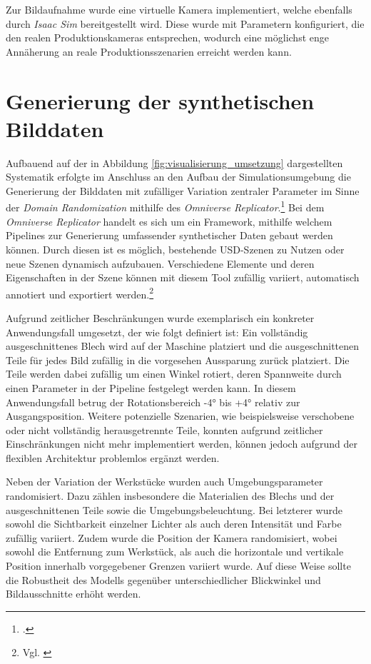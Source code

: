 Zur Bildaufnahme wurde eine virtuelle Kamera implementiert, welche ebenfalls durch \textit{Isaac Sim} bereitgestellt wird. Diese wurde mit Parametern konfiguriert, die den realen Produktionskameras entsprechen, wodurch eine möglichst enge Annäherung an reale Produktionsszenarien erreicht werden kann.


\section{Generierung der synthetischen Bilddaten}

Aufbauend auf der in Abbildung \ref{fig:visualisierung_umsetzung} dargestellten Systematik erfolgte im Anschluss an den Aufbau der Simulationsumgebung die Generierung der Bilddaten mit zufälliger Variation zentraler Parameter im Sinne der \textit{Domain Randomization} mithilfe des \textit{Omniverse Replicator}.\footcite{nvidia_replicator_2025}
Bei dem \textit{Omniverse Replicator} handelt es sich um ein Framework, mithilfe welchem Pipelines zur Generierung umfassender synthetischer Daten gebaut werden können. Durch diesen ist es möglich, bestehende USD-Szenen zu Nutzen oder neue Szenen dynamisch aufzubauen. Verschiedene Elemente und deren Eigenschaften in der Szene können mit diesem Tool zufällig variiert, automatisch annotiert und exportiert werden.\footnote{Vgl. \cite{nvidia_replicator_2025}}

Aufgrund zeitlicher Beschränkungen wurde exemplarisch ein konkreter Anwendungsfall umgesetzt, der wie folgt definiert ist:
Ein vollständig ausgeschnittenes Blech wird auf der Maschine platziert und die ausgeschnittenen Teile für jedes Bild zufällig in die vorgesehen Aussparung zurück platziert. Die Teile werden dabei zufällig um einen Winkel rotiert, deren Spannweite durch einen Parameter in der Pipeline festgelegt werden kann. In diesem Anwendungsfall betrug der Rotationsbereich -4° bis +4° relativ zur Ausgangsposition. Weitere potenzielle Szenarien, wie beispielsweise verschobene oder nicht vollständig herausgetrennte Teile, konnten aufgrund zeitlicher Einschränkungen nicht mehr implementiert werden, können jedoch aufgrund der flexiblen Architektur problemlos ergänzt werden.

Neben der Variation der Werkstücke wurden auch Umgebungsparameter randomisiert. Dazu zählen insbesondere die Materialien des Blechs und der ausgeschnittenen Teile sowie die Umgebungsbeleuchtung. Bei letzterer wurde sowohl die Sichtbarkeit einzelner Lichter als auch deren Intensität und Farbe zufällig variiert. Zudem wurde die Position der Kamera randomisiert, wobei sowohl die Entfernung zum Werkstück, als auch die horizontale und vertikale Position innerhalb vorgegebener Grenzen variiert wurde. Auf diese Weise sollte die Robustheit des Modells gegenüber unterschiedlicher Blickwinkel und Bildausschnitte erhöht werden.

